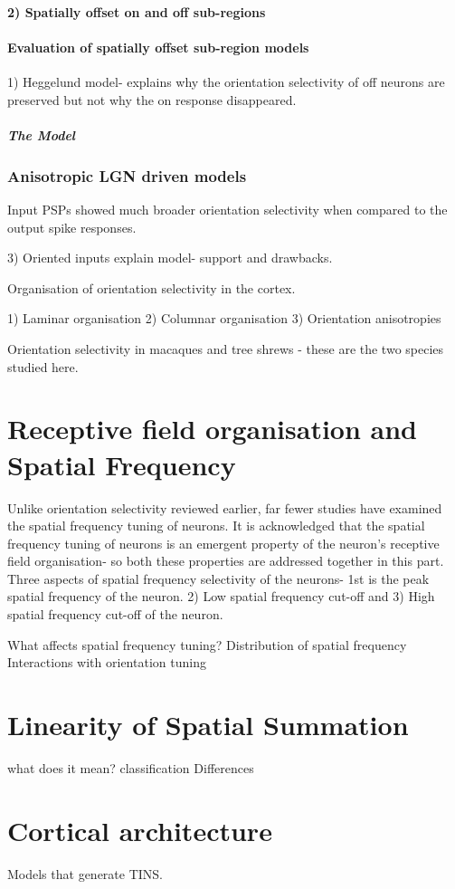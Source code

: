 \paragraph{2) Spatially offset on and off sub-regions}



\paragraph{Evaluation of spatially offset sub-region models}

1) Heggelund model- explains why the orientation selectivity of off neurons are preserved but not why the on response disappeared.


\subparagraph{The Model}

\subsubsection{Anisotropic LGN driven models}

\cite{Volgushev2000} Input PSPs showed much broader orientation selectivity when compared to the output spike responses.

3) Oriented inputs
explain model- support and drawbacks.


Organisation of orientation selectivity in the cortex.

1) Laminar organisation
2) Columnar organisation
3) Orientation anisotropies

Orientation selectivity in macaques and tree shrews - these are the two species studied here.


\section{Receptive field organisation and Spatial Frequency}

Unlike orientation selectivity reviewed earlier, far fewer studies have examined the spatial frequency tuning of neurons. It is acknowledged that the spatial frequency tuning of neurons is an emergent property of the neuron's receptive field organisation- so both these properties are addressed together in this part.
Three aspects of spatial frequency selectivity of the neurons- 1st is the peak spatial frequency of the neuron. 2) Low spatial frequency cut-off and 3) High spatial frequency cut-off of the neuron.


What affects spatial frequency tuning?
Distribution of spatial frequency
Interactions with orientation tuning


\section{Linearity of Spatial Summation}

what does it mean?
classification
Differences

\section{Cortical architecture}

Models that generate
TINS.

